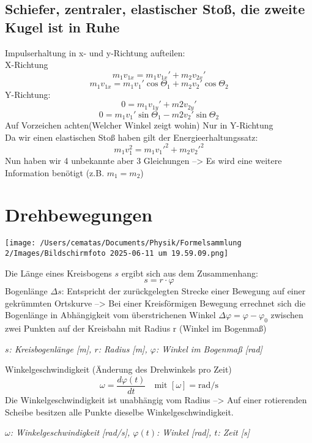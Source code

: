 \documentclass[a4paper,10pt]{article}
\newenvironment{displayformula}
{
	\begin{framed}
		\color{formulaColor}
	}
	{\end{framed}}
\newcommand{\formulalegend}[1]{%
	\par\vspace{0.5ex}%
	{{\color{legendColor}\RaggedRight\small\textit{#1}}}%
	\par\vspace{1.5ex}%
}
\begin{document}
\subsection{Schiefer, zentraler, elastischer Stoß, die zweite Kugel ist in Ruhe}

\begin{displayformula}
	Impulserhaltung in x- und y-Richtung aufteilen: \\
	X-Richtung
	\[
	m_1v_{1x} = m_1v_{1x}' + m_2v_{2x}'
	\]
	\[
	m_1v_{1x} = m_1v_1' \cos \Theta_1 + m_2v_2' \cos \Theta_2
	\]
	Y-Richtung:
	\[
	0 = m_1v_{1y}' + m2v_{2y}'
	\]
	\[
	0 = m_1v_1' \sin \Theta_1  - m2v_2' \sin \Theta_2
	\]
	Auf Vorzeichen achten(Welcher Winkel zeigt wohin) Nur in Y-Richtung \\
	Da wir einen elastischen Stoß haben gilt der Energieerhaltungssatz:
	\[
		m_1 v_1^2 = m_1 v_1'^2 +  m_2 v_2'^2
	\]
	Nun haben wir 4 unbekannte aber 3 Gleichungen --> Es wird eine weitere Information benötigt (z.B. $m_1 = m_2$)
\end{displayformula}

\section{Drehbewegungen}

\texttt{[image: /Users/cematas/Documents/Physik/Formelsammlung 2/Images/Bildschirmfoto 2025-06-11 um 19.59.09.png]}

\begin{displayformula}
	Die Länge eines Kreisbogens \( s \) ergibt sich aus dem Zusammenhang:
	\[
	s = r \cdot \varphi 
	\]
	Bogenlänge $\Delta s$: Entspricht der zurückgelegten Strecke einer Bewegung auf einer gekrümmten Ortskurve --> Bei einer Kreisförmigen Bewegung errechnet sich die Bogenlänge in Abhängigkeit vom überstrichenen Winkel $\Delta \varphi = \varphi - \varphi_0$ zwischen zwei Punkten auf der Kreisbahn mit Radius r (Winkel im Bogenmaß)
\end{displayformula}
\formulalegend{
	\( s \): Kreisbogenlänge [m], \( r \): Radius [m], \( \varphi \): Winkel im Bogenmaß [rad]
}

\begin{displayformula}
	Winkelgeschwindigkeit (Änderung des Drehwinkels pro Zeit)
	\[
	\omega = \frac{d\varphi(t)}{dt} \quad \text{mit } [\omega] = \text{rad/s}
	\]
	Die Winkelgeschwindigkeit ist unabhängig vom Radius --> Auf einer rotierenden Scheibe besitzen alle Punkte dieselbe Winkelgeschwindigkeit.
\end{displayformula}
\formulalegend{
	\( \omega \): Winkelgeschwindigkeit [rad/s], \( \varphi(t) \): Winkel [rad], \( t \): Zeit [s]
}
\end{document}
